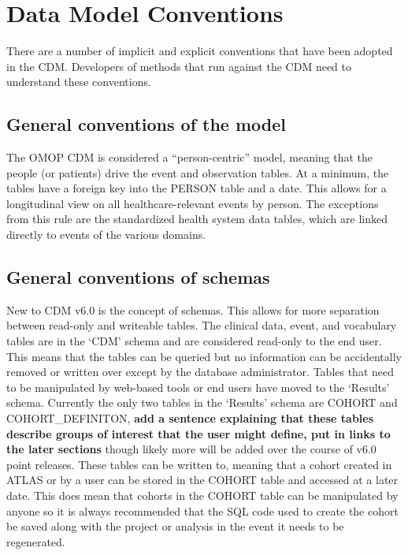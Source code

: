 \documentclass[]{book}
\begin{document}
\hypertarget{data-model-conventions}{%
\section{Data Model Conventions}\label{data-model-conventions}}

There are a number of implicit and explicit conventions that have been adopted in the CDM. Developers of methods that run against the CDM need to understand these conventions.

\hypertarget{model-conv}{%
\subsection{General conventions of the model}\label{model-conv}}

The OMOP CDM is considered a ``person-centric'' model, meaning that the people (or patients) drive the event and observation tables. At a minimum, the tables have a foreign key into the PERSON table and a date. This allows for a longitudinal view on all healthcare-relevant events by person. The exceptions from this rule are the standardized health system data tables, which are linked directly to events of the various domains.

\hypertarget{general-conventions-of-schemas}{%
\subsection{General conventions of schemas}\label{general-conventions-of-schemas}}

New to CDM v6.0 is the concept of schemas. This allows for more separation between read-only and writeable tables. The clinical data, event, and vocabulary tables are in the `CDM' schema and are considered read-only to the end user. This means that the tables can be queried but no information can be accidentally removed or written over except by the database administrator. Tables that need to be manipulated by web-based tools or end users have moved to the `Results' schema. Currently the only two tables in the `Results' schema are COHORT and COHORT\_DEFINITON, \textbf{add a sentence explaining that these tables describe groups of interest that the user might define, put in links to the later sections} though likely more will be added over the course of v6.0 point releases. These tables can be written to, meaning that a cohort created in ATLAS or by a user can be stored in the COHORT table and accessed at a later date. This does mean that cohorts in the COHORT table can be manipulated by anyone so it is always recommended that the SQL code used to create the cohort be saved along with the project or analysis in the event it needs to be regenerated.
\end{document}
